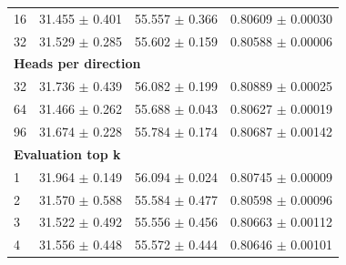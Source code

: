 \begin{tabular}{lccc}
16 & 31.455 $\pm$ 0.401 & 55.557 $\pm$ 0.366 & 0.80609 $\pm$ 0.00030 \\
32 & 31.529 $\pm$ 0.285 & 55.602 $\pm$ 0.159 & 0.80588 $\pm$ 0.00006 \\
\multicolumn{4}{l}{\textbf{Heads per direction}} \\
32 & 31.736 $\pm$ 0.439 & 56.082 $\pm$ 0.199 & 0.80889 $\pm$ 0.00025 \\
64 & 31.466 $\pm$ 0.262 & 55.688 $\pm$ 0.043 & 0.80627 $\pm$ 0.00019 \\
96 & 31.674 $\pm$ 0.228 & 55.784 $\pm$ 0.174 & 0.80687 $\pm$ 0.00142 \\
\multicolumn{4}{l}{\textbf{Evaluation top k}} \\
1 & 31.964 $\pm$ 0.149 & 56.094 $\pm$ 0.024 & 0.80745 $\pm$ 0.00009 \\
2 & 31.570 $\pm$ 0.588 & 55.584 $\pm$ 0.477 & 0.80598 $\pm$ 0.00096 \\
3 & 31.522 $\pm$ 0.492 & 55.556 $\pm$ 0.456 & 0.80663 $\pm$ 0.00112 \\
4 & 31.556 $\pm$ 0.448 & 55.572 $\pm$ 0.444 & 0.80646 $\pm$ 0.00101 \\
\bottomrule
\end{tabular}
\endgroup
